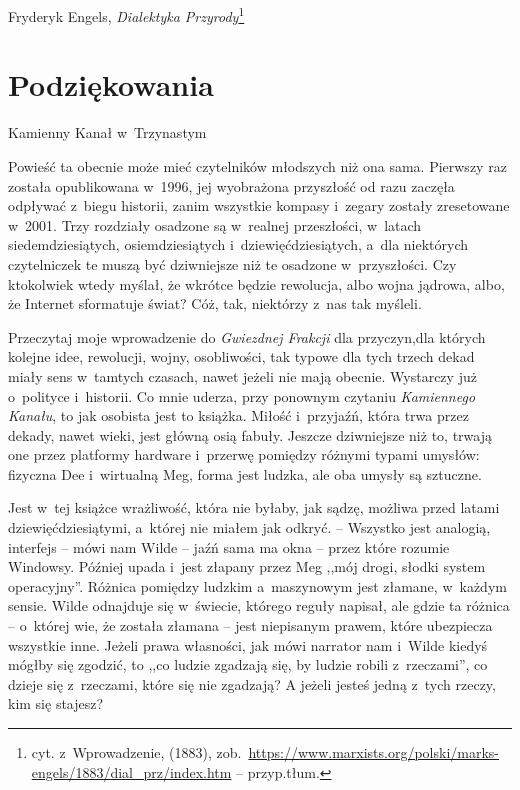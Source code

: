 \documentclass[oneside,polish,11pt,sfheadings]{mwbk}
\begin{document}
\begin{flushright}

Fryderyk Engels, \emph{Dialektyka Przyrody}\footnote{cyt. z~Wprowadzenie,
(1883), zob.~\url{https://www.marxists.org/polski/marks-engels/1883/dial_prz/index.htm}  -- przyp.tłum.}

\end{flushright}


\chapter*{Podziękowania}

Kamienny Kanał w~Trzynastym

Powieść ta obecnie może mieć czytelników młodszych niż ona sama.
Pierwszy raz została opublikowana w~1996, jej wyobrażona przyszłość od
razu zaczęła odpływać z~biegu historii, zanim wszystkie kompasy i~zegary
zostały zresetowane w~2001. Trzy rozdziały osadzone są w~realnej
przeszłości, w~latach siedemdziesiątych, osiemdziesiątych i~dziewięćdziesiątych, a~dla niektórych czytelniczek te muszą być
dziwniejsze niż te osadzone w~przyszłości. Czy ktokolwiek wtedy myślał,
że wkrótce będzie rewolucja, albo wojna jądrowa, albo, że Internet
sformatuje świat? Cóż, tak, niektórzy z~nas tak myśleli.

Przeczytaj moje wprowadzenie do \emph{Gwiezdnej Frakcji} dla
przyczyn,dla których kolejne idee, rewolucji, wojny, osobliwości, tak
typowe dla tych trzech dekad miały sens w~tamtych czasach, nawet jeżeli
nie mają obecnie. Wystarczy już o~polityce i~historii. Co mnie uderza,
przy ponownym czytaniu \emph{Kamiennego Kanału}, to jak osobista jest to
książka. Miłość i~przyjaźń, która trwa przez dekady, nawet wieki, jest
główną osią fabuły. Jeszcze dziwniejsze niż to, trwają one przez
platformy hardware i~przerwę pomiędzy różnymi typami umysłów: fizyczna
Dee i~wirtualną Meg, forma jest ludzka, ale oba umysły są sztuczne.

Jest w~tej książce wrażliwość, która nie byłaby, jak sądzę, możliwa
przed latami dziewięćdziesiątymi, a~której nie miałem jak odkryć. -- Wszystko jest analogią, interfejs -- mówi nam Wilde -- jaźń sama ma okna -- przez które rozumie Windowsy. Później upada i~jest złapany przez Meg
,,mój drogi, słodki system operacyjny''. Różnica pomiędzy ludzkim a~maszynowym jest złamane, w~każdym sensie. Wilde odnajduje się w~świecie,
którego reguły napisał, ale gdzie ta różnica -- o~której wie, że została
złamana -- jest niepisanym prawem, które ubezpiecza wszystkie inne.
Jeżeli prawa własności, jak mówi narrator nam i~Wilde kiedyś mógłby się
zgodzić, to ,,co ludzie zgadzają się, by ludzie robili z~rzeczami'', co
dzieje się z~rzeczami, które się nie zgadzają? A jeżeli jesteś jedną z~tych rzeczy, kim się stajesz?
\end{document}
